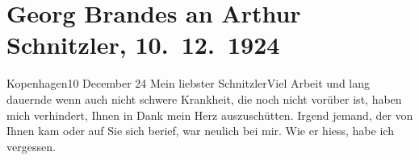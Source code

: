 

         
         \renewcommand{\erwaehntePersonen}{Personen: Armand-Louis de Gontaut de Biron, Georg Brandes, Gaius Iulius Caesar,  Jesus, Erwin Magnus, Charles Maurice de Talleyrand-Périgord}
         \renewcommand{\erwaehnteInstitutionen}{Institutionen: Erich-Reiss-Verlag}
         \renewcommand{\erwaehnteOrte}{Orte: Dänemark, Frankreich, Gilleleje, Kopenhagen, Russland, Seeland, Skandinavien, Wien, Österreich}
         \renewcommand{\erwaehnteWerke}{Werke: Fräulein Else, Gaius Julius Cæsar, Hertuginden af Dino og Fyrsten af Talleyrand, Komödie der Verführung. In drei Akten, Lieutenant Gustl. Novelle, Uimodstaaelige: (Attende aarhundrede, Frankrig), Urkristendom}
               \section[Georg Brandes an Arthur Schnitzler, 10. 12. 1924]{ Georg Brandes an Arthur Schnitzler, 10. 12. 1924}\nopagebreak{}\rehead{ }\begin{ledgroupsized}[t]{13cm}\normalsize\beginnumbering{} \toendnotes[C]{\smallbreak\pagebreak[2]} 
\toendnotes[C]{\smallbreak}\pstart
           \raggedleft{}{\pb}Kopenhagen10 December 24\pend
           \pstart
           Mein liebster Schnitzler\hspace*{3.5em}Viel Arbeit und lang dauernde wenn auch nicht
               schwere Krankheit, die noch nicht vorüber ist, haben mich verhindert, Ihnen in Dank
               mein Herz auszuschütten. Irgend jemand, der von Ihnen kam oder auf Sie sich berief,
               war neulich bei mir. Wie er hiess, habe ich vergessen.\pend
           \pstart

\end{ledgroupsized}
